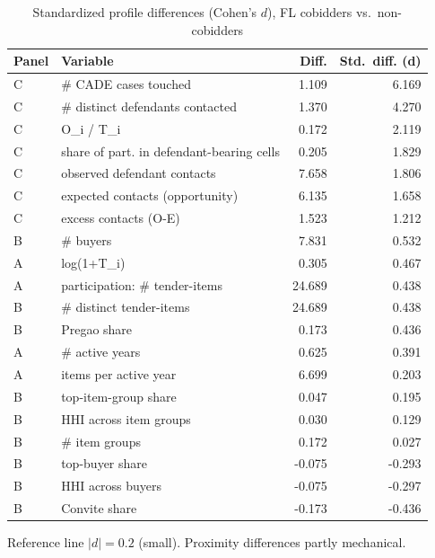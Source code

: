 \begin{table}[htbp]\centering\footnotesize
\caption{Standardized profile differences (Cohen's $d$), FL cobidders vs.\ non-cobidders}
\label{tab:std_profile_diff}
\begin{tabular}{llrr}\hline
Panel & Variable & Diff. & Std.\ diff. (d) \\\hline
C & # CADE cases touched & 1.109 & 6.169 \\
C & # distinct defendants contacted & 1.370 & 4.270 \\
C & O\_i / T\_i & 0.172 & 2.119 \\
C & share of part. in defendant-bearing cells & 0.205 & 1.829 \\
C & observed defendant contacts & 7.658 & 1.806 \\
C & expected contacts (opportunity) & 6.135 & 1.658 \\
C & excess contacts (O-E) & 1.523 & 1.212 \\
B & # buyers & 7.831 & 0.532 \\
A & log(1+T\_i) & 0.305 & 0.467 \\
A & participation: # tender-items & 24.689 & 0.438 \\
B & # distinct tender-items & 24.689 & 0.438 \\
B & Pregao share & 0.173 & 0.436 \\
A & # active years & 0.625 & 0.391 \\
A & items per active year & 6.699 & 0.203 \\
B & top-item-group share & 0.047 & 0.195 \\
B & HHI across item groups & 0.030 & 0.129 \\
B & # item groups & 0.172 & 0.027 \\
B & top-buyer share & -0.075 & -0.293 \\
B & HHI across buyers & -0.075 & -0.297 \\
B & Convite share & -0.173 & -0.436 \\
\hline\end{tabular}
\begin{tablenotes}\footnotesize\item Reference line $|d|=0.2$ (small). Proximity differences partly mechanical.\end{tablenotes}
\end{table}
